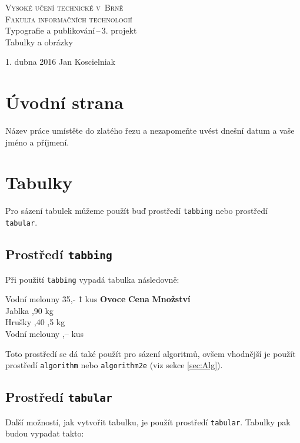 \documentclass[11pt,a4paper]{article}
\begin{document}
\begin{titlepage}
\begin{center}
\Huge
\textsc{Vysoké učení technické v~Brně}\\
\huge
\textsc{Fakulta informačních technologií\\}
\LARGE
Typografie a publikování\,--\,3. projekt \\
\Huge
Tabulky a obrázky
\end{center} 
{\Large 1. dubna 2016 \hfill
Jan Koscielniak}
\end{titlepage}
\section{Úvodní strana}
Název práce umístěte do zlatého řezu a nezapomeňte uvést dnešní datum a vaše jméno a příjmení.
\section{Tabulky}
Pro sázení tabulek můžeme použít buď prostředí \texttt{tabbing} nebo prostředí \texttt{tabular}.
\subsection{Prostředí \texttt{tabbing}}
Při použití \texttt{tabbing} vypadá tabulka následovně:
\begin{tabbing}
Vodní melouny \quad \= 35,- \qquad \= 1 kus \kill
\textbf{Ovoce} \> \textbf{Cena} \> \textbf{Množství} \\
Jablka ,90  kg \\
Hrušky ,40 ,5 kg \\
Vodní melouny ,--  kus \\
\end{tabbing}
Toto prostředí se dá také použít pro sázení algoritmů, ovšem vhodnější je použít 
prostředí \texttt{algorithm} nebo \texttt{algorithm2e} (viz sekce \ref{sec:Alg}).
\subsection{Prostředí \texttt{tabular}}
Další možností, jak vytvořit tabulku, je použít prostředí \texttt{tabular}. Tabulky pak 
budou vypadat takto\footnotemark:
\end{document}
